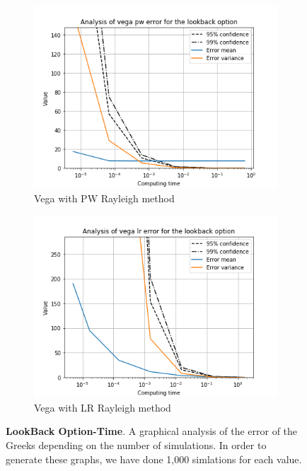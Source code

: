 \documentclass[11pt,a4paper,fleqn]{article}
\begin{document}
\begin{figure}[h!]
      \begin{subfigure}[b]{0.45\textwidth}
          \includegraphics[width=\textwidth]{graphs/lookbackvegapwtime.png}
          \caption{Vega with PW Rayleigh method}
      \end{subfigure}
      \begin{subfigure}[b]{0.45\textwidth}
          \includegraphics[width=\textwidth]{graphs/lookbackvegalrtime.png}
          \caption{Vega with LR Rayleigh method}
      \end{subfigure}

      \caption{\textbf{LookBack Option-Time}. A graphical analysis of the error of the Greeks depending on the number of simulations. In order to generate these graphs, we have done 1,000 simlations for each value.}
\end{figure}
\end{document}
